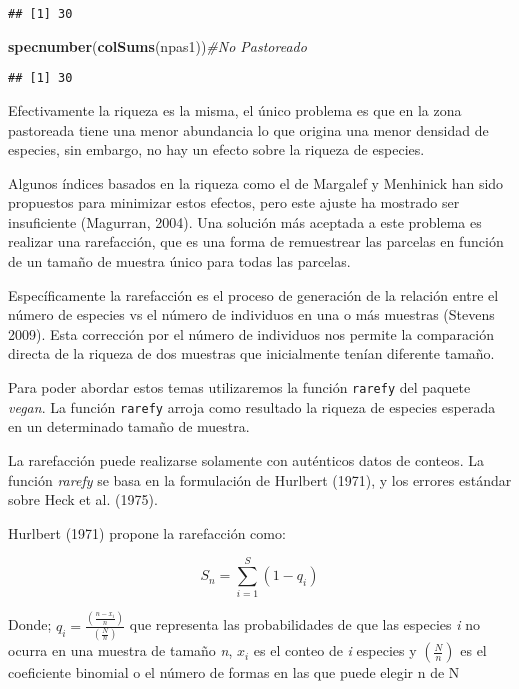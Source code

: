 \documentclass[]{book}
\newenvironment{Shaded}{\begin{snugshade}}{\end{snugshade}}
\newcommand{\KeywordTok}[1]{\textcolor[rgb]{0.13,0.29,0.53}{\textbf{{#1}}}}
\newcommand{\CommentTok}[1]{\textcolor[rgb]{0.56,0.35,0.01}{\textit{{#1}}}}
\newcommand{\NormalTok}[1]{{#1}}
\begin{document}
\begin{verbatim}
## [1] 30
\end{verbatim}

\begin{Shaded}
\begin{Highlighting}[]
\KeywordTok{specnumber}\NormalTok{(}\KeywordTok{colSums}\NormalTok{(npas1))}\CommentTok{#No Pastoreado}
\end{Highlighting}
\end{Shaded}

\begin{verbatim}
## [1] 30
\end{verbatim}

Efectivamente la riqueza es la misma, el único problema es que en la
zona pastoreada tiene una menor abundancia lo que origina una menor
densidad de especies, sin embargo, no hay un efecto sobre la riqueza de
especies.

Algunos índices basados en la riqueza como el de Margalef y Menhinick
han sido propuestos para minimizar estos efectos, pero este ajuste ha
mostrado ser insuficiente (Magurran, 2004). Una solución más aceptada a
este problema es realizar una rarefacción, que es una forma de
remuestrear las parcelas en función de un tamaño de muestra único para
todas las parcelas.

Específicamente la rarefacción es el proceso de generación de la
relación entre el número de especies vs el número de individuos en una o
más muestras (Stevens 2009). Esta corrección por el número de individuos
nos permite la comparación directa de la riqueza de dos muestras que
inicialmente tenían diferente tamaño.

Para poder abordar estos temas utilizaremos la función \texttt{rarefy}
del paquete \emph{vegan}. La función \texttt{rarefy} arroja como
resultado la riqueza de especies esperada en un determinado tamaño de
muestra.

La rarefacción puede realizarse solamente con auténticos datos de
conteos. La función \emph{rarefy} se basa en la formulación de Hurlbert
(1971), y los errores estándar sobre Heck et al. (1975).

Hurlbert (1971) propone la rarefacción como:

\[S_n= \sum_{i=1}^S (1-q_i)\]

Donde; \(q_i= \frac{(\frac{n-x_i}{n})}{(\frac{N}{n})}\) que representa
las probabilidades de que las especies \emph{i} no ocurra en una muestra
de tamaño \emph{n}, \(x_i\) es el conteo de \emph{i} especies y
\((\frac{N}{n})\) es el coeficiente binomial o el número de formas en
las que puede elegir n de N
\end{document}

